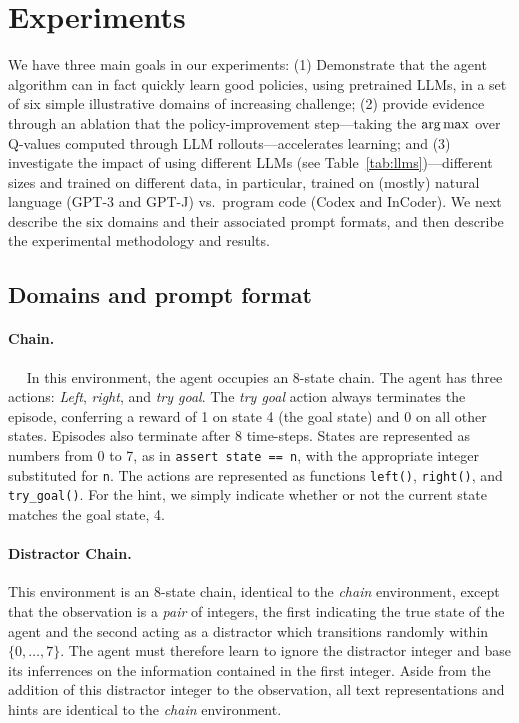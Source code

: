 \documentclass{article}
\begin{document}
\section{Experiments}
\label{sec:experiments}
We have three main goals in our experiments: (1) Demonstrate that the agent
algorithm can in fact quickly learn good policies,  using pretrained LLMs, in a
set of six simple illustrative domains of increasing challenge; (2) provide
evidence through an ablation that the policy-improvement step---taking the
$\arg\max$ over Q-values computed through LLM rollouts---accelerates learning;
and (3) investigate the impact of using different LLMs (see
Table~\ref{tab:llms})---different sizes and trained on different data, in
particular, trained on (mostly) natural language (GPT-3 and GPT-J) vs.\ program
code (Codex and InCoder). We next describe the six domains and their
associated prompt formats, and then describe the experimental methodology and
results.
\subsection{Domains and prompt format}
\label{sec:domains-and-prompt-format}
\paragraph{Chain.}~~ In this environment, the agent occupies an 8-state chain.
The agent has three actions:  \emph{Left}, \emph{right}, and \emph{try goal}.
The \emph{try goal} action always terminates the episode, conferring a reward of
1 on state 4 (the goal state) and 0 on all other states.
Episodes also terminate after 8 time-steps. States are represented as numbers
from 0 to 7, as in \texttt{assert state == n}, with the appropriate integer
substituted for \texttt{n}. The actions are represented as functions
\texttt{left()}, \texttt{right()}, and \texttt{try\_goal()}. For the hint, we
simply indicate whether or not the current state matches the goal state, 4.
\paragraph{Distractor Chain.} This environment is an 8-state chain, identical to
the \emph{chain} environment, except that the observation is a \emph{pair} of
integers, the first indicating the true state of the agent and the second acting
as a distractor which transitions randomly within $\{0, \dots, 7\}$. The agent
must therefore learn to ignore the distractor integer and base its inferrences
on the information contained in the first integer. Aside from the addition of
this distractor integer to the observation, all text representations and hints
are identical to the \emph{chain} environment.
\end{document}
